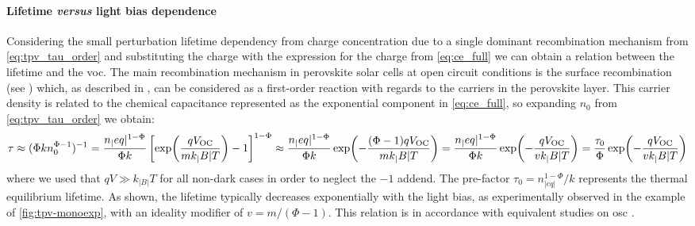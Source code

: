 		\paragraph{Lifetime \textsl{versus} light bias dependence}\label{tpv_tau_vs_intensity}
		Considering the small perturbation lifetime dependency from charge concentration due to a single dominant recombination mechanism from \cref{eq:tpv_tau_order} and substituting the charge with the expression for the charge from \cref{eq:ce_full} we can obtain a relation between the lifetime and the \gls{voc}.
		The main recombination mechanism in perovskite solar cells at open circuit conditions is the surface recombination (see ) which, as described in , can be considered as a first\hyp{}order reaction with regards to the carriers \label{tpv_chemical_charge}in the perovskite layer.
		This carrier density is related to the chemical capacitance represented as the exponential component in \cref{eq:ce_full}, so expanding $n_0$ from \cref{eq:tpv_tau_order} we obtain:
		\begin{dmath}\label{eq:tpv_tau_vs_intensity}
			\tau \approx (\Phi k n_0^{\Phi-1})^{-1} = \frac{n_|eq|^{1-\Phi}}{\Phi k} \left[\exp(\frac{q\voc}{mk_|B|T}) - 1\right]^{1-\Phi} \approx \frac{n_|eq|^{1-\Phi}}{\Phi k} \exp(-\frac{(\Phi-1)q\voc}{mk_|B|T}) = \frac{n_|eq|^{1-\Phi}}{\Phi k} \exp(-\frac{q\voc}{vk_|B|T}) = \frac{\tau_0}{\Phi} \exp(-\frac{q\voc}{vk_|B|T})
		\end{dmath}
		where we used that $qV \gg k_|B|T$ for all non-dark cases in order to neglect the $-1$ addend.
		The pre\hyp{}factor $\tau_0 = n_|eq|^{1-\Phi}/k$ represents the thermal equilibrium lifetime.
		As shown, the lifetime typically decreases exponentially with the light bias, as experimentally observed in the example of \cref{fig:tpv-monoexp}, with an ideality modifier of $v = m/(\Phi-1)$.
		This relation is in accordance with equivalent studies on \gls{osc} \cite{Shuttle2008,Shuttle2008d,Credgington2011}.

